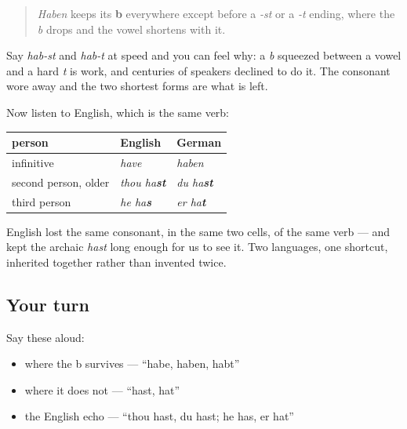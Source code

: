 \begin{grammarlens}[title={Grammar Lens: one shortcut, in exactly two cells}]
\begin{quote}
\emph{Haben} keeps its \textbf{b} everywhere except before a \emph{-st} or a \emph{-t} ending, where the \emph{b} drops and the vowel shortens with it.
\end{quote}

Say \emph{hab-st} and \emph{hab-t} at speed and you can feel why: a \emph{b} squeezed between a vowel and a hard \emph{t} is work, and centuries of speakers declined to do it. The consonant wore away and the two shortest forms are what is left.

Now listen to English, which is the same verb:

\noindent
\begin{tabularx}{\linewidth}{@{}>{\raggedright\arraybackslash}X>{\raggedright\arraybackslash}X>{\raggedright\arraybackslash}X@{}}
\toprule
\textbf{person} & \textbf{English} & \textbf{German} \\
\midrule
infinitive & \emph{have} & \emph{haben} \\
second person, older & \emph{thou ha\textbf{st}} & \emph{du ha\textbf{st}} \\
third person & \emph{he ha\textbf{s}} & \emph{er ha\textbf{t}} \\
\bottomrule
\end{tabularx}

English lost the same consonant, in the same two cells, of the same verb — and kept the archaic \emph{hast} long enough for us to see it. Two languages, one shortcut, inherited together rather than invented twice.
\end{grammarlens}

\subsection*{Your turn}
Say these aloud:

\begin{itemize}
\raggedright
  \item where the b survives — \textquotedblleft{}habe, haben, habt\textquotedblright{}
  \item where it does not — \textquotedblleft{}hast, hat\textquotedblright{}
  \item the English echo — \textquotedblleft{}thou hast, du hast; he has, er hat\textquotedblright{}
\end{itemize}

